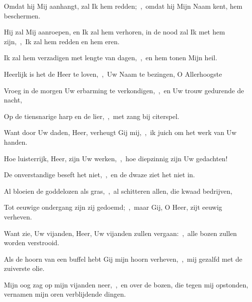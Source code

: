 \documentclass[12pt,twoside,a5paper]{article}
\begin{document}

\begin{halfparskip}
  Omdat hij Mij aanhangt, zal Ik hem redden;~\sep\ omdat hij Mijn Naam kent, hem beschermen.

  Hij zal Mij aanroepen, en Ik zal hem verhoren, in de nood zal Ik met hem zijn,~\sep\ Ik zal hem redden en hem eren.

  Ik zal hem verzadigen met lengte van dagen,~\sep\ en hem tonen Mijn heil.
\end{halfparskip}



\begin{halfparskip}
  Heerlijk is het de Heer te loven,~\sep\ Uw Naam te bezingen, O Allerhoogste


  Vroeg in de morgen Uw erbarming te verkondigen,~\sep\ en Uw trouw gedurende de nacht,

  Op de tiensnarige harp en de lier,~\sep\ met zang bij citerspel.

  Want door Uw daden, Heer, verheugt Gij mij,~\sep\ ik juich om het werk van Uw handen.
\end{halfparskip}


\begin{halfparskip}
  Hoe luisterrijk, Heer, zijn Uw werken,~\sep\ hoe diepzinnig zijn Uw gedachten!

  De onverstandige beseft het niet,~\sep\ en de dwaze ziet het niet in.

  Al bloeien de goddelozen als gras,~\sep\ al schitteren allen, die kwaad bedrijven,

  Tot eeuwige ondergang zijn zij gedoemd;~\sep\ maar Gij, O Heer, zijt eeuwig verheven.

  Want zie, Uw vijanden, Heer, Uw vijanden zullen vergaan:~\sep\ alle bozen zullen worden verstrooid.

  Als de hoorn van een buffel hebt Gij mijn hoorn verheven,~\sep\ mij gezalfd met de zuiverste olie.

  Mijn oog zag op mijn vijanden neer,~\sep\ en over de bozen, die tegen mij opstonden, vernamen mijn oren verblijdende dingen.
\end{halfparskip}
\end{document}
